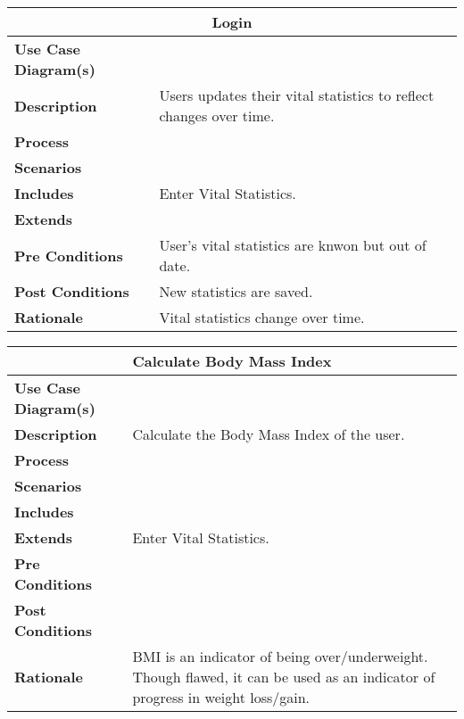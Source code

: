 \documentclass[12pt]{article}
\begin{document}
\begin{center}
\begin{tabularx}{\textwidth}{ |X|X|}
\hline
\multicolumn{2}{|c|}{\textbf{Login}}\\
\hline
\hline
\textbf{Use Case Diagram(s)} & \\ \hline
\textbf{Description} & Users updates their vital statistics to reflect changes over time. \\ \hline
\textbf{Process} & \\ \hline
\textbf{Scenarios} & \\ \hline
\textbf{Includes} & Enter Vital Statistics.\\ \hline
\textbf{Extends} & \\ \hline
\textbf{Pre Conditions} & User's vital statistics are knwon but out of date.\\ \hline
\textbf{Post Conditions} & New statistics are saved.\\ \hline
\textbf{Rationale} & Vital statistics change over time.\\ \hline
\end{tabularx}
\end{center}


\begin{center}
\begin{tabularx}{\textwidth}{ |X|X|}
\hline
\multicolumn{2}{|c|}{\textbf{Calculate Body Mass Index}}\\
\hline
\hline
\textbf{Use Case Diagram(s)} & \\ \hline
\textbf{Description} & Calculate the Body Mass Index of the user.\\ \hline
\textbf{Process} & \\ \hline
\textbf{Scenarios} & \\ \hline
\textbf{Includes} &  \\ \hline
\textbf{Extends} & Enter Vital Statistics. \\ \hline
\textbf{Pre Conditions} & \\ \hline
\textbf{Post Conditions} &\\ \hline
\textbf{Rationale} & BMI is an indicator of being over/underweight. Though flawed, it can be used as an indicator of progress in weight loss/gain. \\ \hline
\end{tabularx}
\end{center}
\end{document}
